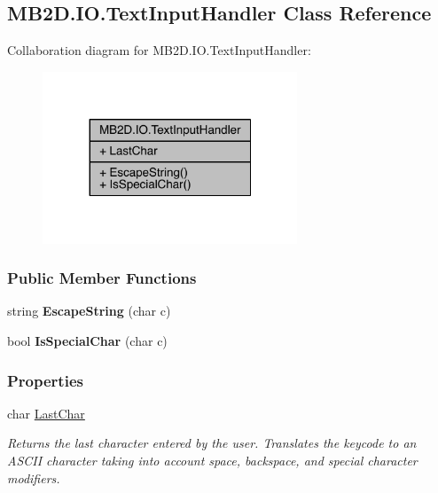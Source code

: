 \hypertarget{class_m_b2_d_1_1_i_o_1_1_text_input_handler}{}\subsection{M\+B2\+D.\+I\+O.\+Text\+Input\+Handler Class Reference}
\label{class_m_b2_d_1_1_i_o_1_1_text_input_handler}


Collaboration diagram for M\+B2\+D.\+I\+O.\+Text\+Input\+Handler\+:
\nopagebreak
\begin{figure}[H]
\begin{center}
\leavevmode
\includegraphics[width=215pt]{class_m_b2_d_1_1_i_o_1_1_text_input_handler__coll__graph}
\end{center}
\end{figure}
\subsubsection*{Public Member Functions}
\begin{DoxyCompactItemize}
\item 
\hypertarget{class_m_b2_d_1_1_i_o_1_1_text_input_handler_aebc1a5d52a49c769347ecaae106ff670}{}\label{class_m_b2_d_1_1_i_o_1_1_text_input_handler_aebc1a5d52a49c769347ecaae106ff670} 
string {\bfseries Escape\+String} (char c)
\item 
\hypertarget{class_m_b2_d_1_1_i_o_1_1_text_input_handler_afd04f2a2de624d589acc777c382d1b3c}{}\label{class_m_b2_d_1_1_i_o_1_1_text_input_handler_afd04f2a2de624d589acc777c382d1b3c} 
bool {\bfseries Is\+Special\+Char} (char c)
\end{DoxyCompactItemize}
\subsubsection*{Properties}
\begin{DoxyCompactItemize}
\item 
char \hyperlink{class_m_b2_d_1_1_i_o_1_1_text_input_handler_a874b0ae4b35ff53064c893e49562dfeb}{Last\+Char}
\begin{DoxyCompactList}\small\item\em Returns the last character entered by the user. Translates the keycode to an A\+S\+C\+II character taking into account space, backspace, and special character modifiers. \end{DoxyCompactList}\end{DoxyCompactItemize}



